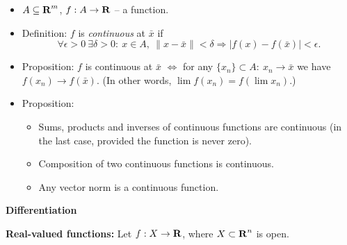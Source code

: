 \documentclass[11pt]{article}
\begin{document}
\begin{itemize}
\item $A\subseteq{\mbox{\textbf{R}}}^m$, $f:A\rightarrow{\mbox{\textbf{R}}}$ -- a function.
\item Definition: $f$ is \emph{continuous} at $\bar x$ if
$$
\forall\epsilon>0\ \exists\delta>0:\ x\in A,\ \|x-\bar x\|<\delta\Rightarrow|f(x)-f(\bar x)|<\epsilon.
$$
\item Proposition: $f$ is continuous at $\bar x$ $\Leftrightarrow$ for any $\{x_n\}\subset A:\ x_n\rightarrow \bar x$ we have
$f(x_n)\rightarrow f(\bar x)$.
(In other words, $\lim f(x_n)=f(\lim x_n)$.)
\item Proposition:
\begin{itemize}
\item Sums, products and inverses of continuous functions are continuous (in the last case, provided the
function is never zero).
\item Composition of two continuous functions is continuous.
\item Any vector norm is a continuous function.
\end{itemize}
\end{itemize}
\begin{center}
\textbf{Differentiation}
\end{center}
\textbf{Real-valued functions:} Let $f:X\rightarrow{\mbox{\textbf{R}}}$, where $X\subset{\mbox{\textbf{R}}}^n$ is open.
\end{document}
